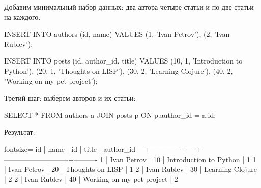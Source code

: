 Добавим минимальный набор данных: два автора четыре статьи и по две статьи на каждого.

\begin{english}
  \begin{sql}
INSERT INTO authors (id, name) VALUES
  (1, 'Ivan Petrov'),
  (2, 'Ivan Rublev');

INSERT INTO posts (id, author_id, title) VALUES
  (10, 1, 'Introduction to Python'),
  (20, 1, 'Thoughts on LISP'),
  (30, 2, 'Learning Clojure'),
  (40, 2, 'Working on my pet project');
  \end{sql}
\end{english}

Третий шаг: выберем авторов и их статьи:

\begin{english}
  \begin{sql}
SELECT *
FROM authors a
JOIN posts p ON p.author_id = a.id;
  \end{sql}
\end{english}

Результат:

\begin{english}
  \begin{text*}{fontsize=\small}
id |    name     | id |            title          | author_id
---+-------------+----+---------------------------+----------
 1 | Ivan Petrov | 10 | Introduction to Python    |         1
 1 | Ivan Petrov | 20 | Thoughts on LISP          |         1
 2 | Ivan Rublev | 30 | Learning Clojure          |         2
 2 | Ivan Rublev | 40 | Working on my pet project |         2
  \end{text*}
\end{english}


